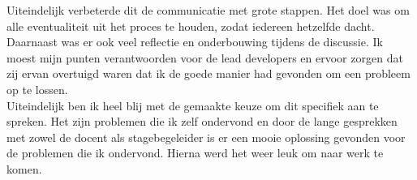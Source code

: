Uiteindelijk verbeterde dit de communicatie met grote stappen. Het doel was om alle eventualiteit uit het proces te houden, zodat iedereen hetzelfde dacht. \\

Daarnaast was er ook veel reflectie en onderbouwing tijdens de discussie. Ik moest mijn punten verantwoorden voor de lead developers en ervoor zorgen dat zij ervan overtuigd waren dat ik de goede manier had gevonden om een probleem op te lossen. \\

Uiteindelijk ben ik heel blij met de gemaakte keuze om dit specifiek aan te spreken. Het zijn problemen die ik zelf ondervond en door de lange gesprekken met zowel de docent als stagebegeleider is er een mooie oplossing gevonden voor de problemen die ik ondervond. Hierna werd het weer leuk om naar werk te komen. \\